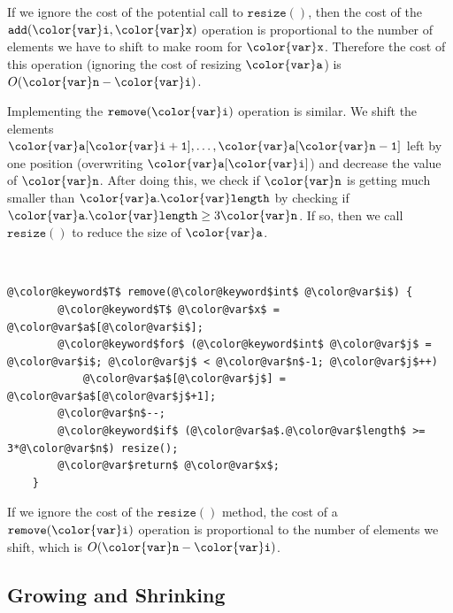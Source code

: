 \documentclass[10pt]{book}
\theoremstyle{plain}
\theoremstyle{definition}
\begin{document}
If we ignore the cost of the potential call to \ensuremath{\mathtt{resize()}}, then the cost
of the \ensuremath{\mathtt{add({\color{var}i},{\color{var}x})}} operation is proportional to the number of elements we
have to shift to make room for \ensuremath{\mathtt{{\color{var}x}}}.  Therefore the cost of this operation
(ignoring the cost of resizing \ensuremath{\mathtt{{\color{var}a}}}) is $O(\ensuremath{\mathtt{{\color{var}n}}}-\ensuremath{\mathtt{{\color{var}i}}})$.

Implementing the \ensuremath{\mathtt{remove({\color{var}i})}} operation is similar.  We shift the elements
$\ensuremath{\mathtt{{\color{var}a}[{\color{var}i}+1]}},\ldots,\ensuremath{\mathtt{{\color{var}a}[{\color{var}n}-1]}}$ left by one position (overwriting \ensuremath{\mathtt{{\color{var}a}[{\color{var}i}]}}) and
decrease the value of \ensuremath{\mathtt{{\color{var}n}}}.  After doing this, we check if \ensuremath{\mathtt{{\color{var}n}}} is getting
much smaller than \ensuremath{\mathtt{{\color{var}a}.{\color{var}length}}} by checking if $\ensuremath{\mathtt{{\color{var}a}.{\color{var}length}}} \ge 3\ensuremath{\mathtt{{\color{var}n}}}$. If so,
then we call \ensuremath{\mathtt{resize()}} to reduce the size of \ensuremath{\mathtt{{\color{var}a}}}.



 \ \vspace{.5ex}\begin{Verbatim}[gobble=1,tabsize=2,frame=single,framerule=1.2pt,commandchars=\\@\$,label=\texttt{ArrayStack},labelposition=topline]
	@\color@keyword$T$ remove(@\color@keyword$int$ @\color@var$i$) {
		@\color@keyword$T$ @\color@var$x$ = @\color@var$a$[@\color@var$i$];
		@\color@keyword$for$ (@\color@keyword$int$ @\color@var$j$ = @\color@var$i$; @\color@var$j$ < @\color@var$n$-1; @\color@var$j$++) 
			@\color@var$a$[@\color@var$j$] = @\color@var$a$[@\color@var$j$+1];
		@\color@var$n$--;
		@\color@keyword$if$ (@\color@var$a$.@\color@var$length$ >= 3*@\color@var$n$) resize();
		@\color@var$return$ @\color@var$x$;
	}
\end{Verbatim}

If we ignore the cost of the \ensuremath{\mathtt{resize()}} method, the cost of a \ensuremath{\mathtt{remove({\color{var}i})}}
operation is proportional to the number of elements we shift, which
is $O(\ensuremath{\mathtt{{\color{var}n}}}-\ensuremath{\mathtt{{\color{var}i}}})$.

\subsection{Growing and Shrinking}
\end{document}
